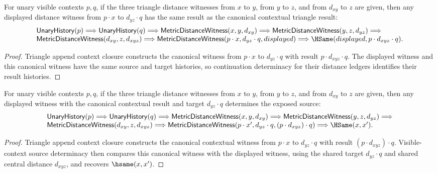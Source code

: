 \begin{theorem}
\label{thm:metric-distance-witness-triangle-append-context-result-deterministic}
For unary visible contexts $p,q$, if the three triangle distance witnesses
from $x$ to $y$, from $y$ to $z$, and from $d_{xy}$ to $z$ are given, then any
displayed distance witness from $p\cdot x$ to $d_{yz}\cdot q$ has the same
result as the canonical contextual triangle result:
$$
\begin{array}{l}
\mathsf{UnaryHistory}(p)\Longrightarrow
\mathsf{UnaryHistory}(q)\Longrightarrow
\mathsf{MetricDistanceWitness}(x,y,d_{xy})\Longrightarrow
\mathsf{MetricDistanceWitness}(y,z,d_{yz})\Longrightarrow
\\
\mathsf{MetricDistanceWitness}(d_{xy},z,d_{xyz})\Longrightarrow
\mathsf{MetricDistanceWitness}(p\cdot x,d_{yz}\cdot q,displayed)
\Longrightarrow
\HSame(displayed,p\cdot d_{xyz}\cdot q).
\end{array}
$$
\end{theorem}
\begin{proof}
Triangle append context closure constructs the canonical witness from
$p\cdot x$ to $d_{yz}\cdot q$ with result $p\cdot d_{xyz}\cdot q$. The
displayed witness and this canonical witness have the same source and target
histories, so continuation determinacy for their distance ledgers identifies
their result histories.
\end{proof}

\begin{theorem}
\label{thm:metric-distance-witness-triangle-append-context-source-deterministic}
For unary visible contexts $p,q$, if the three triangle distance witnesses
from $x$ to $y$, from $y$ to $z$, and from $d_{xy}$ to $z$ are given, then
any displayed witness with the canonical contextual result and target
$d_{yz}\cdot q$ determines the exposed source:
$$
\begin{array}{l}
\mathsf{UnaryHistory}(p)\Longrightarrow
\mathsf{UnaryHistory}(q)\Longrightarrow
\mathsf{MetricDistanceWitness}(x,y,d_{xy})\Longrightarrow
\mathsf{MetricDistanceWitness}(y,z,d_{yz})\Longrightarrow
\\
\mathsf{MetricDistanceWitness}(d_{xy},z,d_{xyz})\Longrightarrow
\mathsf{MetricDistanceWitness}(p\cdot x',d_{yz}\cdot q,
(p\cdot d_{xyz})\cdot q)
\Longrightarrow
\HSame(x,x').
\end{array}
$$
\end{theorem}
\begin{proof}
Triangle append context closure constructs the canonical contextual witness
from $p\cdot x$ to $d_{yz}\cdot q$ with result $(p\cdot d_{xyz})\cdot q$.
Visible-context source determinacy then compares this canonical witness with
the displayed witness, using the shared target $d_{yz}\cdot q$ and shared
central distance $d_{xyz}$, and recovers $\hsame(x,x')$.
\end{proof}

